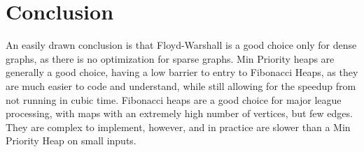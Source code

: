 \documentclass[a4paper,12pt]{article}
\begin{document}
\section{Conclusion}
An easily drawn conclusion is that Floyd-Warshall is a good choice only for dense graphs, as there is no optimization for sparse graphs. Min Priority heaps are generally a good choice, having a low barrier to entry to Fibonacci Heaps, as they are much easier to code and understand, while still allowing for the speedup from not running in cubic time. Fibonacci heaps are a good choice for major league processing, with maps with an extremely high number of vertices, but few edges. They are complex to implement, however, and in practice are slower than a Min Priority Heap on small inputs.
\end{document}
